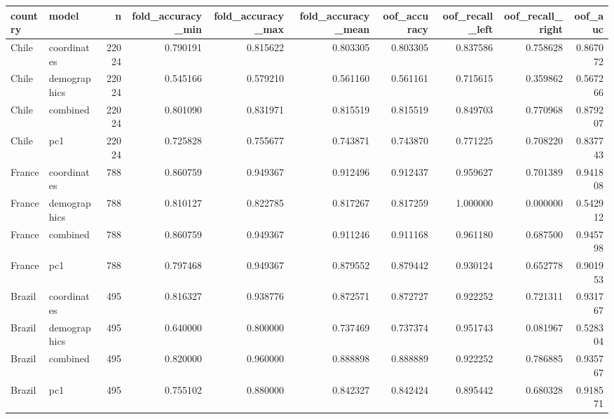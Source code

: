\begin{tabular}{llrrrrrrrr}
\toprule
country & model & n & fold_accuracy_min & fold_accuracy_max & fold_accuracy_mean & oof_accuracy & oof_recall_left & oof_recall_right & oof_auc \\
\midrule
Chile & coordinates & 22024 & 0.790191 & 0.815622 & 0.803305 & 0.803305 & 0.837586 & 0.758628 & 0.867072 \\
Chile & demographics & 22024 & 0.545166 & 0.579210 & 0.561160 & 0.561161 & 0.715615 & 0.359862 & 0.567266 \\
Chile & combined & 22024 & 0.801090 & 0.831971 & 0.815519 & 0.815519 & 0.849703 & 0.770968 & 0.879207 \\
Chile & pc1 & 22024 & 0.725828 & 0.755677 & 0.743871 & 0.743870 & 0.771225 & 0.708220 & 0.837743 \\
France & coordinates & 788 & 0.860759 & 0.949367 & 0.912496 & 0.912437 & 0.959627 & 0.701389 & 0.941808 \\
France & demographics & 788 & 0.810127 & 0.822785 & 0.817267 & 0.817259 & 1.000000 & 0.000000 & 0.542912 \\
France & combined & 788 & 0.860759 & 0.949367 & 0.911246 & 0.911168 & 0.961180 & 0.687500 & 0.945798 \\
France & pc1 & 788 & 0.797468 & 0.949367 & 0.879552 & 0.879442 & 0.930124 & 0.652778 & 0.901953 \\
Brazil & coordinates & 495 & 0.816327 & 0.938776 & 0.872571 & 0.872727 & 0.922252 & 0.721311 & 0.931767 \\
Brazil & demographics & 495 & 0.640000 & 0.800000 & 0.737469 & 0.737374 & 0.951743 & 0.081967 & 0.528304 \\
Brazil & combined & 495 & 0.820000 & 0.960000 & 0.888898 & 0.888889 & 0.922252 & 0.786885 & 0.935767 \\
Brazil & pc1 & 495 & 0.755102 & 0.880000 & 0.842327 & 0.842424 & 0.895442 & 0.680328 & 0.918571 \\
\bottomrule
\end{tabular}
